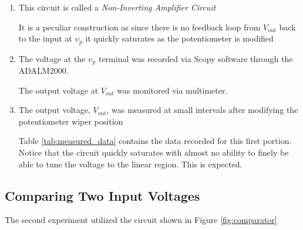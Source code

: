 \documentclass[12pt]{article}
\begin{document}
\begin{enumerate}
	\item This circuit is called a \textit{Non-Inverting Amplifier Circuit}

	      It is a peculiar construction as since there is no feedback loop from
	      \(V_{out}\) back to the input at \(\upsilon_p\) it quickly saturates as
	      the potentiometer is modified

	\item The voltage at the \(\upsilon_p\) terminal was recorded via Scopy
	      software through the ADALM2000.

	      The output voltage at \(V_{out}\) was
	      monitored via multimeter.

	\item The output voltage, \(V_{out}\), was measured at small intervals after modifying the
	      potentiometer wiper position

	      Table \ref{tab:measured_data} contains the data recorded for this first
	      portion. Notice that the circuit quickly saturates with almost no
	      ability to finely be able to tune the voltage to the linear region. This
	      is expected.
\end{enumerate}
\subsection{Comparing Two Input Voltages}
The second experiment utilized the circuit shown in Figure \ref{fig:comparator}
\end{document}
